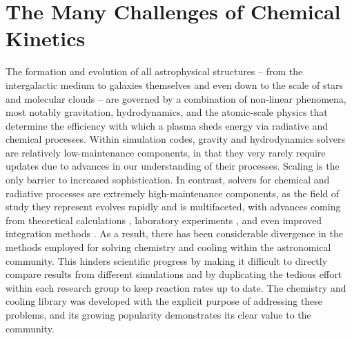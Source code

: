 \section{The Many Challenges of Chemical Kinetics}

The formation and evolution of all astrophysical structures -- from
the intergalactic medium to galaxies themselves and even down to the scale of
stars and molecular clouds -- are governed
by a combination of non-linear phenomena, most notably gravitation,
hydrodynamics, and the atomic-scale physics that determine the
efficiency with which a plasma sheds energy via radiative and
chemical processes.  Within simulation codes, gravity and
hydrodynamics solvers are relatively low-maintenance components, in
that they very rarely require updates due to advances in our
understanding of their processes.  Scaling is the only barrier to
increased sophistication.
In contrast, solvers for chemical and radiative processes are
extremely high-maintenance components, as the field of study they
represent evolves rapidly and is multifaceted, with advances coming
from theoretical calculations \citep[e.g.,][]{2007MNRAS.377..705F,
  2007MNRAS.382..133W, 2008MNRAS.388.1627G, 2008ApJ...689.1105L,
  2012JChPh.137o4303L, 2014ApJ...790...10S, 2015MNRAS.453..810L,
  2016MNRAS.457.3732C, 2017MNRAS.466.2175C}, laboratory experiments
\citep[e.g.,][]{2010Sci...329...69K, 2010PhRvA..82d2708B,
  2011PhRvA..84e2709M, 2015JPhCS.635b2092R, 2015ApJS..219....6O,
  2016ApJ...816...31D, 2016ApJ...832...31V}, and even improved integration
methods \citep[e.g.,][]{CURTIS2017312, 2014JCoPh.256..854N}.  As a result, there
has been considerable divergence in the methods employed for solving chemistry
and cooling within the astronomical community.  This hinders scientific
progress by making it difficult to directly compare results from
different simulations and by duplicating the tedious effort
within each research group to keep reaction rates up to date. The
\grackle{} chemistry and cooling library was developed with the
explicit purpose of addressing these problems, and its growing popularity
demonstrates its clear value to the community.

